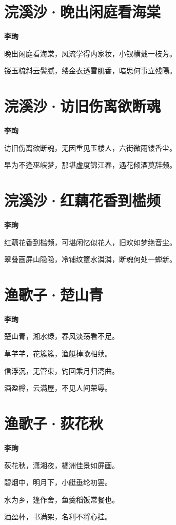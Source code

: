 \documentclass[12pt,a4paper]{ctexbook}
\begin{document}
\section{浣溪沙·晚出闲庭看海棠}
\textbf{李珣}\par\vspace{0.5em}
晚出闲庭看海棠，风流学得内家妆，小钗横戴一枝芳。\par
镂玉梳斜云鬓腻，缕金衣透雪肌香，暗思何事立残陽。\par

\section{浣溪沙·访旧伤离欲断魂}
\textbf{李珣}\par\vspace{0.5em}
访旧伤离欲断魂，无因重见玉楼人，六街微雨镂香尘。\par
早为不逢巫峡梦，那堪虚度锦江春，遇花倾酒莫辞频。\par

\section{浣溪沙·红藕花香到槛频}
\textbf{李珣}\par\vspace{0.5em}
红藕花香到槛频，可堪闲忆似花人，旧欢如梦绝音尘。\par
翠叠画屏山隐隐，冷铺纹簟水潾潾，断魂何处一蝉新。\par

\section{渔歌子·楚山青}
\textbf{李珣}\par\vspace{0.5em}
楚山青，湘水绿，春风淡荡看不足。\par
草芊芊，花簇簇，渔艇棹歌相续。\par
信浮沉，无管束，钓回乘月归湾曲。\par
酒盈樽，云满屋，不见人间荣辱。\par

\section{渔歌子·荻花秋}
\textbf{李珣}\par\vspace{0.5em}
荻花秋，潇湘夜，橘洲佳景如屏画。\par
碧烟中，明月下，小艇垂纶初罢。\par
水为乡，篷作舍，鱼羹稻饭常餐也。\par
酒盈杯，书满架，名利不将心挂。\par
\end{document}
